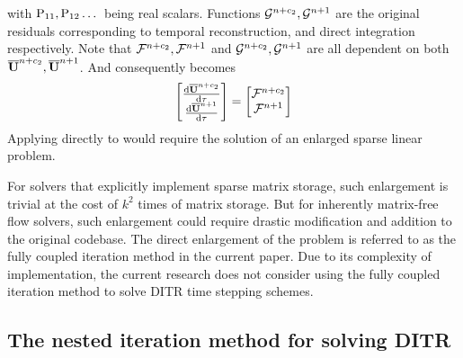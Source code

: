 with $\mathrm{P}_{11},\mathrm{P}_{12} \dots$ being real scalars.
Functions $\mathcal{G}^{n+c_2},\mathcal{G}^{n+1}$ are the original residuals
corresponding to temporal reconstruction,  and
direct integration  respectively. Note that
$\mathcal{F}^{n+c_2},\mathcal{F}^{n+1}$ and $\mathcal{G}^{n+c_2},\mathcal{G}^{n+1}$ are all
dependent on both $\overline{\mathbf{U}}^{n+c_2},\overline{\mathbf{U}}^{n+1}$.
And consequently  becomes
\begin{equation}
    \begin{bmatrix}
        \derivative{\uu^{n+c_2}}{\tau} \\
        \derivative{\uu^{n+1}}{\tau}
    \end{bmatrix} =
    \begin{bmatrix}
        \FF^{n+c_2} \\
        \FF^{n+1}
    \end{bmatrix}
    \label{eq:DITRNaiveDualTime}
\end{equation}
Applying  directly to 
would require the solution of an enlarged sparse linear problem.

For solvers that explicitly implement sparse matrix storage,
such enlargement is trivial at the cost of $k^2$ times
of matrix storage. But for inherently matrix-free flow solvers,
such enlargement could require drastic modification and addition to
the original codebase.
The direct enlargement of the problem is referred to as
the fully coupled iteration method in the current paper.
Due to its complexity of implementation,
the current research does not consider using the
fully coupled iteration method
to solve DITR time stepping schemes.




\subsection{The nested iteration method for solving DITR}


